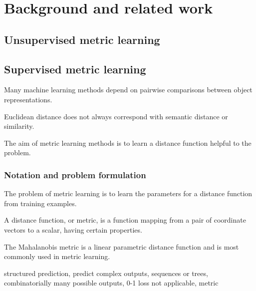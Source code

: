 \documentclass[a4paper,titlepage]{article}
\begin{document}
%

\pagebreak
\section{Background and related work}


\subsection{Unsupervised metric learning}


\subsection{Supervised metric learning}
\label{sec:metric_learning}



Many machine learning methods depend on pairwise comparisons between object representations. 

Euclidean distance does not always correspond with semantic distance or similarity.

The aim of metric learning methods is to learn a distance function helpful to the problem.




\subsubsection{Notation and problem formulation}


The problem of metric learning is to learn the parameters for a distance function from training examples.

A distance function, or metric, is a function mapping from a pair of coordinate vectors to a scalar, having certain properties.

The Mahalanobis metric is a linear parametric distance function and is most commonly used in metric learning.



structured prediction, predict complex outputs, sequences or trees, combinatorially many possible outputs, 0-1 loss not applicable, metric 
\end{document}
